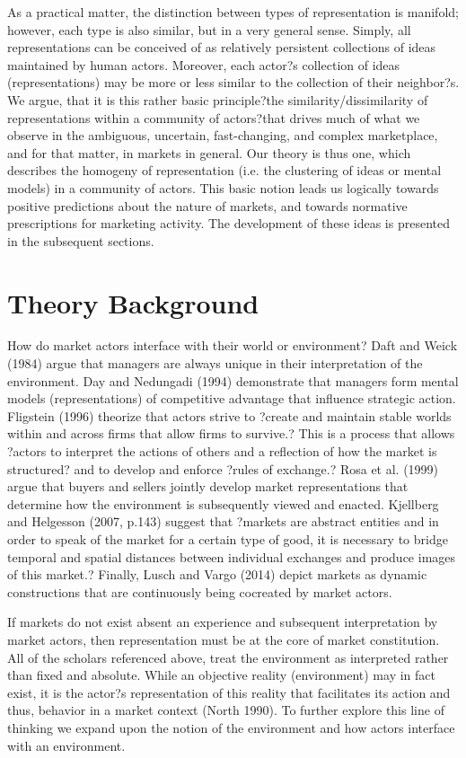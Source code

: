 As a practical matter, the distinction between types of representation is manifold; however, each type is also similar, but in a very general sense. Simply, all representations can be conceived of as relatively persistent collections of ideas maintained by human actors. Moreover, each actor?s collection of ideas (representations) may be more or less similar to the collection of their neighbor?s. We argue, that it is this rather basic principle?the similarity/dissimilarity of representations within a community of actors?that drives much of what we observe in the ambiguous, uncertain, fast-changing, and complex marketplace, and for that matter, in markets in general. Our theory is thus one, which describes the homogeny of representation (i.e. the clustering of ideas or mental models) in a community of actors. This basic notion leads us logically towards positive predictions about the nature of markets, and towards normative prescriptions for marketing activity. The development of these ideas is presented in the subsequent sections.

\section{Theory Background}

How do market actors interface with their world or environment? Daft and Weick (1984) argue that managers are always unique in their interpretation of the environment. Day and Nedungadi (1994) demonstrate that managers form mental models (representations) of competitive advantage that influence strategic action. Fligstein (1996) theorize that actors strive to ?create and maintain stable worlds within and across firms that allow firms to survive.? This is a process that allows ?actors to interpret the actions of others and a reflection of how the market is structured? and to develop and enforce ?rules of exchange.?  Rosa et al. (1999) argue that buyers and sellers jointly develop market representations that determine how the environment is subsequently viewed and enacted. Kjellberg and Helgesson (2007, p.143) suggest that ?markets are abstract entities and in order to speak of the market for a certain type of good, it is necessary to bridge temporal and spatial distances between individual exchanges and produce images of this market.? Finally, Lusch and Vargo (2014) depict markets as dynamic constructions that are continuously being cocreated by market actors. 

If markets do not exist absent an experience and subsequent interpretation by market actors, then representation must be at the core of market constitution. All of the scholars referenced above, treat the environment as interpreted rather than fixed and absolute. While an objective reality (environment) may in fact exist, it is the actor?s representation of this reality that facilitates its action and thus, behavior in a market context (North 1990). To further explore this line of thinking we expand upon the notion of the environment and how actors interface with an environment. 

